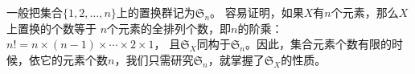 \documentclass[12pt,UTF8]{ctexbook}
\begin{document}
一般把集合$\{1,2,\ldots, n\}$上的置换群记为$\mathfrak{S}_n$。
容易证明，如果$X$有$n$个元素，那么$X$上置换的个数等于
$n$个元素的全排列个数，即$n$的阶乘：$n! = n\times (n-1)\times \cdots\times 2 \times  1$，
且$\mathfrak{S}_X$同构于$\mathfrak{S}_n$。因此，集合元素个数有限的时候，依它的元素个数$n$，我们只需研究$\mathfrak{S}_n$，就掌握了$\mathfrak{S}_X$的性质。

\end{document}
